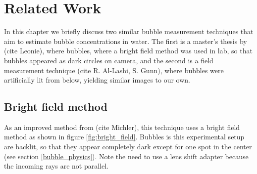 \chapter{Related Work}
 

In this chapter we briefly discuss two similar bubble measurement techniques that aim to estimate bubble concentrations in water. The first is a master's thesis by (cite Leonie), where bubbles, where a bright field method was used in lab, so that bubbles appeared as dark circles on camera, and the second is a field measurement technique (cite R. Al-Lashi, S. Gunn), where bubbles were artificially lit from below, yielding similar images to our own. 

\section{Bright field method}
	As an improved method from (cite Michler), this technique uses a bright field method as shown in figure \ref{fig:bright_field}. Bubbles is this experimental setup are backlit, so that they appear completely dark except for one spot in the center (see section  \ref{bubble_physics}). Note the need to use a lens shift adapter because the incoming rays are not parallel. 
	
